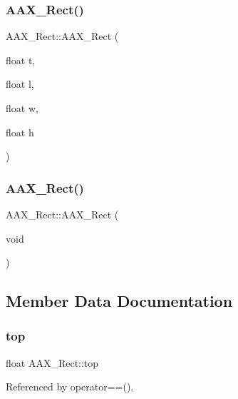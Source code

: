 \subsubsection{\texorpdfstring{AAX\_Rect()}{AAX\_Rect()}\hspace{0.1cm}{\footnotesize\ttfamily [1/2]}}
{\footnotesize\ttfamily A\+A\+X\+\_\+\+Rect\+::\+A\+A\+X\+\_\+\+Rect (\begin{DoxyParamCaption}\item[{float}]{t,  }\item[{float}]{l,  }\item[{float}]{w,  }\item[{float}]{h }\end{DoxyParamCaption})\hspace{0.3cm}{\ttfamily [inline]}}

\mbox{\label{a01613_a87743f1594fa99d12019861b95893316}} 
\subsubsection{\texorpdfstring{AAX\_Rect()}{AAX\_Rect()}\hspace{0.1cm}{\footnotesize\ttfamily [2/2]}}
{\footnotesize\ttfamily A\+A\+X\+\_\+\+Rect\+::\+A\+A\+X\+\_\+\+Rect (\begin{DoxyParamCaption}\item[{void}]{ }\end{DoxyParamCaption})\hspace{0.3cm}{\ttfamily [inline]}}



\subsection{Member Data Documentation}
\mbox{\label{a01613_a49731e154df78f0811f271c83c56cdb3}} 
\subsubsection{\texorpdfstring{top}{top}}
{\footnotesize\ttfamily float A\+A\+X\+\_\+\+Rect\+::top}



Referenced by operator==().

\mbox{\label{a01613_a1975750fe0b144a6c6bf5495006e8088}} 
